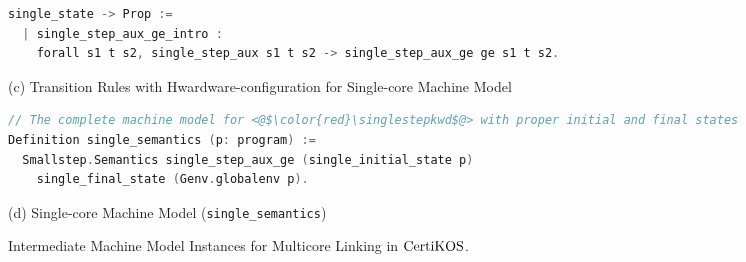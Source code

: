\begin{figure}
\begin{lstlisting}[language=C]
  single_state -> Prop :=
  | single_step_aux_ge_intro : 
    forall s1 t s2, single_step_aux s1 t s2 -> single_step_aux_ge ge s1 t s2.
\end{lstlisting}
\begin{center}
(c) Transition Rules with Hwardware-configuration for Single-core Machine Model
\end{center}
\begin{lstlisting}[language=C, deletekeywords={int}]    
// The complete machine model for <@$\color{red}\singlestepkwd$@> with proper initial and final states
Definition single_semantics (p: program) :=
  Smallstep.Semantics single_step_aux_ge (single_initial_state p) 
    single_final_state (Genv.globalenv p).
\end{lstlisting}
\begin{center}
(d) Single-core Machine Model (\lstinline$single_semantics$)
\end{center}
\caption{Intermediate Machine Model Instances for Multicore Linking in $\mathrm{CertiKOS}$.}
\label{fig:chapter:certikos:multicore-machine-model-instances}
\end{figure}


